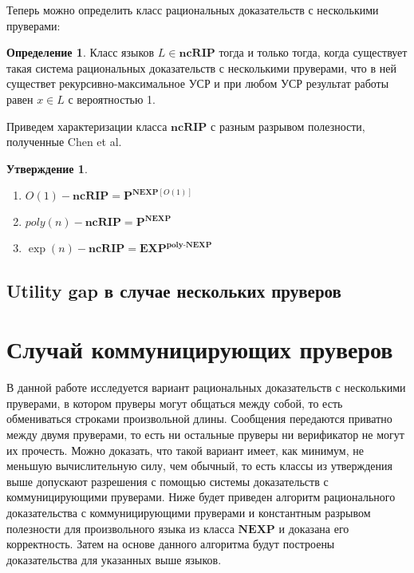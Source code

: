 \documentclass{mipt-thesis-bs}
\theoremstyle{plain}
\newtheorem{proposition}{Утверждение}
\theoremstyle{definition}
\newtheorem{definition}{Определение}
\begin{document}
Теперь можно определить класс рациональных доказательств с несколькими пруверами:

\begin{definition}
    Класс языков $L \in \textbf{ncRIP}$ тогда и только тогда, когда существует такая система рациональных доказательств с несколькими пруверами, что в ней существет рекурсивно-максимальное УСР и при любом УСР результат работы равен $x \in L$ с вероятностью 1.
\end{definition}

Приведем характеризации класса $\textbf{ncRIP}$ с разным разрывом полезности, полученные Chen et al. 

\begin{proposition}
    \begin{enumerate}
        \item $ O(1)-\textbf{ncRIP} = {\textbf{P}}^{\textbf{NEXP}[O(1)] } $
        \item $\textit{poly}(n)-\textbf{ncRIP} = \textbf{P}^{\textbf{NEXP}} $
        \item $\exp(n)-\textbf{ncRIP} = \textbf{EXP}^{\textbf{poly-NEXP}} $
    \end{enumerate}
\end{proposition}
\section{Utility gap в случае нескольких пруверов}


\chapter{Случай коммуницирующих пруверов}

В данной работе исследуется вариант рациональных доказательств с несколькими пруверами, в котором пруверы могут общаться между собой, то есть обмениваться строками произвольной длины. Сообщения передаются приватно между двумя пруверами, то есть ни остальные пруверы ни верификатор не могут их прочесть. Можно доказать, что такой вариант имеет, как минимум, не меньшую вычислительную силу, чем обычный, то есть классы из утверждения выше допускают разрешения с помощью системы доказательств с коммуницирующими пруверами. Ниже будет приведен алгоритм рационального доказательства с коммуницирующими пруверами и константным разрывом полезности для произвольного языка из класса $\textbf{NEXP}$ и доказана его корректность. Затем на основе данного алгоритма будут построены доказательства для указанных выше языков.
\end{document}
